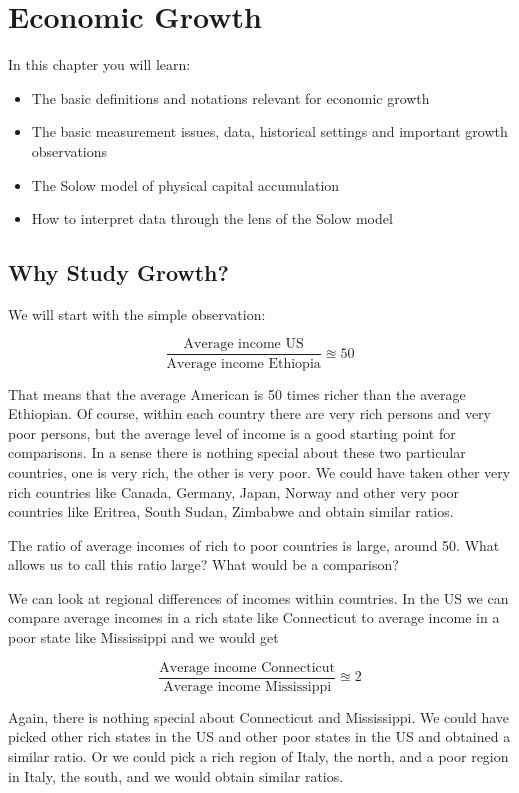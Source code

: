 \documentclass[
]{book}
\providecommand{\tightlist}{%
  \setlength{\itemsep}{0pt}\setlength{\parskip}{0pt}}
\begin{document}
\hypertarget{growth}{%
\chapter{Economic Growth}\label{growth}}

In this chapter you will learn:

\begin{itemize}
\tightlist
\item
  The basic definitions and notations relevant for economic growth
\item
  The basic measurement issues, data, historical settings and important growth observations
\item
  The Solow model of physical capital accumulation
\item
  How to interpret data through the lens of the Solow model
\end{itemize}

\hypertarget{why-study-growth}{%
\section{Why Study Growth?}\label{why-study-growth}}

We will start with the simple observation:

\[\frac{\text{Average income US}}{\text{Average income Ethiopia}} \approxeq 50\]

That means that the average American is 50 times richer than the average Ethiopian. Of course, within each country there are very rich persons and very poor persons, but the average level of income is a good starting point for comparisons. In a sense there is nothing special about these two particular countries, one is very rich, the other is very poor. We could have taken other very rich countries like Canada, Germany, Japan, Norway and other very poor countries like Eritrea, South Sudan, Zimbabwe and obtain similar ratios.

The ratio of average incomes of rich to poor countries is large, around 50. What allows us to call this ratio large? What would be a comparison?

We can look at regional differences of incomes within countries. In the US we can compare average incomes in a rich state like Connecticut to average income in a poor state like Mississippi and we would get

\[\frac{\text{Average income Connecticut}}{\text{Average income Mississippi}} \approxeq 2\]

Again, there is nothing special about Connecticut and Mississippi. We could have picked other rich states in the US and other poor states in the US and obtained a similar ratio. Or we could pick a rich region of Italy, the north, and a poor region in Italy, the south, and we would obtain similar ratios.
\end{document}
